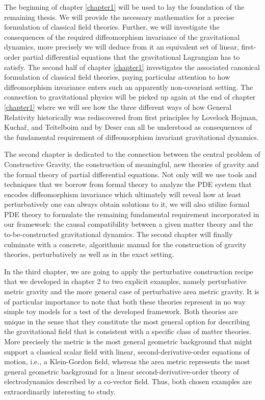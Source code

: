 The beginning of chapter \ref{chapter1} will be used to lay the foundation of the remaining thesis. We will provide the necessary mathematics for a precise formulation of classical field theories. Further, we will investigate the consequences of the required diffeomorphism invariance of the gravitational dynamics, more precisely we will deduce from it an equivalent set of linear, first-order partial differential equations that the gravitational Lagrangian has to satisfy. The second half of chapter \ref{chapter1} investigates the associated canonical formulation of classical field theories, paying particular attention to how diffeomorphism invariance enters such an apparently non-covariant setting. The connection to gravitational physics will be picked up again at the end of chapter \ref{chapter1} where we will see how the three different ways of how General Relativity historically was rediscovered from first principles by Lovelock \cite{doi:10.1063/1.1665613} Hojman, Kuchař, and Teitelboim \cite{HOJMAN197688} and by Deser \cite{1970GReGr...1....9D} can all be understood as consequences of the fundamental requirement of diffeomorphism invariant gravitational dynamics.

The second chapter is dedicated to the connection between the central problem of Constructive Gravity, the construction of meaningful, new theories of gravity and the formal theory of partial differential equations. Not only will we use tools and techniques that we borrow from formal theory to analyze the PDE system that encodes diffeomorphism invariance which ultimately will reveal how at least perturbatively one can always obtain solutions to it, we will also utilize formal PDE theory to formulate the remaining fundamental requirement incorporated in our framework: the causal compatibility between a given matter theory and the to-be-constructed gravitational dynamics. The second chapter will finally culminate with a concrete, algorithmic manual for the construction of gravity theories, perturbatively as well as in the exact setting.  

In the third chapter, we are going to apply the perturbative construction recipe that we developed in chapter 2 to two explicit examples, namely perturbative metric gravity and the more general case of perturbative area metric gravity. It is of particular importance to note that both these theories represent in no way simple toy models for a test of the developed framework. Both theories are unique in the sense that they constitute the most general option for describing the gravitational field that is consistent with a specific class of matter theories. More precisely the metric is the most general geometric background that might support a classical scalar field with linear, second-derivative-order equations of motion, i.e., a Klein-Gordon field, whereas the area metric represents the most general geometric background for a linear second-derivative-order theory of electrodynamics described by a co-vector field. Thus, both chosen examples are extraordinarily interesting to study.

